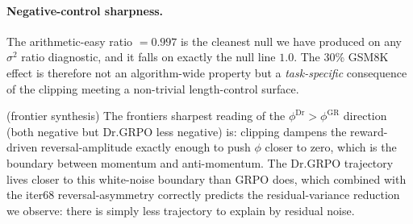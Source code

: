\paragraph{Negative-control sharpness.}
The arithmetic-easy ratio $= 0.997$ is the cleanest null we have
produced on any $\sigma^2$ ratio diagnostic, and it falls on exactly
the null line $1.0$. The 30\% GSM8K effect is therefore not an
algorithm-wide property but a \emph{task-specific} consequence of the
clipping meeting a non-trivial length-control surface.

(frontier synthesis) The frontiers sharpest reading of the
$\phi^{\mathrm{Dr}} > \phi^{\mathrm{GR}}$ direction (both negative but
Dr.GRPO less negative) is: clipping dampens the reward-driven
reversal-amplitude exactly enough to push $\phi$ closer to zero, which
is the boundary between momentum and anti-momentum. The Dr.GRPO
trajectory lives closer to this white-noise boundary than GRPO does,
which combined with the iter68 reversal-asymmetry correctly predicts
the residual-variance reduction we observe: there is simply less
trajectory to explain by residual noise.
